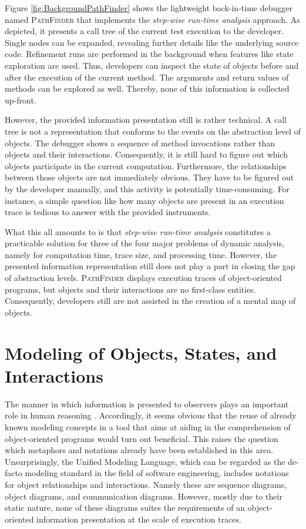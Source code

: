 Figure \ref{fig:BackgroundPathFinder} shows the lightweight back-in-time debugger named \textsc{PathFinder} that implements the \emph{step-wise run-time analysis} approach.
As depicted, it presents a call tree of the current test execution to the developer.
Single nodes can be expanded, revealing further details like the underlying source code.
Refinement runs are performed in the background when features like state exploration are used.
Thus, developers can inspect the state of objects before and after the execution of the current method.
The arguments and return values of methods can be explored as well.
Thereby, none of this information is collected up-front.

However, the provided information presentation still is rather technical.
A call tree is not a representation that conforms to the events on the abstraction level of objects.
The debugger shows a sequence of method invocations rather than objects and their interactions.
Consequently, it is still hard to figure out which objects participate in the current computation.
Furthermore, the relationships between those objects are not immediately obvious.
They have to be figured out by the developer manually, and this activity is potentially time-consuming.
For instance, a simple question like how many objects are present in an execution trace is tedious to answer with the provided instruments.

What this all amounts to is that \emph{step-wise run-time analysis} constitutes a practicable solution for three of the four major problems of dynamic analysis, namely for computation time, trace size, and processing time.
However, the presented information representation still does not play a part in closing the gap of abstraction levels.
\textsc{PathFinder} displays execution traces of object-oriented programs, but objects and their interactions are no first-class entities.
Consequently, developers still are not assisted in the creation of a mental map of objects.

\section[Modeling of Objects, States, and Interactions]{Modeling of Objects, States, and Interactions%
}
\label{s:BackgroundModeling}
The manner in which information is presented to observers plays an important role in human reasoning \cite{diehl_software_2007}.
Accordingly, it seems obvious that the reuse of already known modeling concepts in a tool that aims at aiding in the comprehension of object-oriented programs would turn out beneficial.
This raises the question which metaphors and notations already have been established in this area.
Unsurprisingly, the Unified Modeling Language, which can be regarded as the de-facto modeling standard in the field of software engineering, includes notations for object relationships and interactions.
Namely these are sequence diagrams, object diagrams, and communication diagrams.
However, mostly due to their static nature, none of these diagrams suites the requirements of an object-oriented information presentation at the scale of execution traces.

